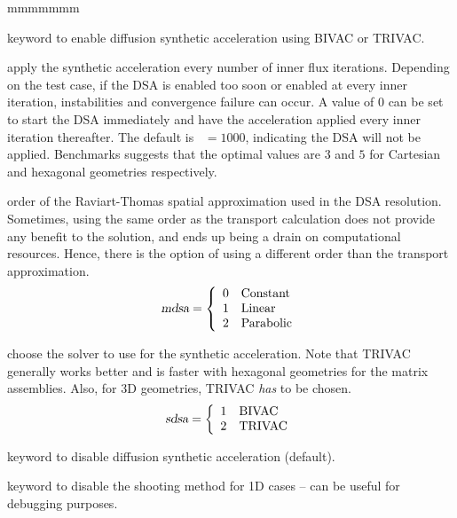 \begin{ListeDeDescription}{mmmmmmm}
\item[\moc{DSA}] keyword to enable diffusion synthetic acceleration using BIVAC or TRIVAC.
\item[\dusa{ndsa}] apply the synthetic acceleration every  number of inner flux iterations. Depending on the test case, if the DSA is enabled too soon or enabled at every inner iteration, instabilities and convergence failure can occur. A value of $0$ can be set to start the DSA immediately and have the acceleration applied every inner iteration thereafter. The default is ~$=1000$, indicating the DSA will not be applied. Benchmarks suggests that the optimal values are $3$ and $5$ for Cartesian and hexagonal geometries respectively.
\item[\dusa{mdsa}] order of the Raviart-Thomas spatial approximation used in the DSA resolution. Sometimes, using the same order as the transport calculation does not provide any benefit to the solution, and ends up being a drain on computational resources. Hence, there is the option of using a different order than the transport approximation.
\begin{displaymath}
\dusa{mdsa} = \left\{
\begin{array}{rl}
 0 & \textrm{Constant} \\
 1 & \textrm{Linear} \\
 2 & \textrm{Parabolic} \\
\end{array} \right.
\end{displaymath}
\item[\dusa{sdsa}] choose the solver to use for the synthetic acceleration. Note that TRIVAC generally works better and is faster with hexagonal geometries for the matrix assemblies. Also, for 3D geometries, TRIVAC \emph{has} to be chosen.
\begin{displaymath}
\dusa{sdsa} = \left\{
\begin{array}{rl}
 1 & \textrm{BIVAC} \\
 2 & \textrm{TRIVAC} \\
\end{array} \right.
\end{displaymath}

\item[\moc{NDSA}] keyword to disable diffusion synthetic acceleration (default).

\item[\moc{NSHT}] keyword to disable the shooting method for 1D cases -- can be useful for debugging purposes.


\end{ListeDeDescription}
